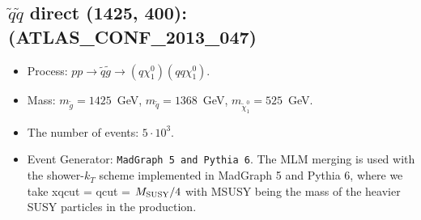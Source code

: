     
\subsection{$\tilde q \tilde q$ direct (1425, 400): (ATLAS\_CONF\_2013\_047)} 


        \begin{itemize}
        \item  Process: $pp \to \tilde q \tilde g \to (q \chi_1^0)(q q \chi_1^0)$.
        \item  Mass: $m_{\tilde g} = 1425$~GeV, $m_{\tilde q} = 1368$~GeV, $m_{\tilde \chi_1^0} = 525$~GeV.
        \item  The number of events: $5 \cdot 10^3$.
        \item  Event Generator: {\tt MadGraph 5 and Pythia 6}.
                The MLM merging is used with the shower-$k_T$ scheme implemented in MadGraph 5 and Pythia 6, where we take xqcut = qcut = $M_{\rm SUSY}/4$ with MSUSY being the mass of the heavier SUSY particles in the production.      
        \end{itemize}    
    

